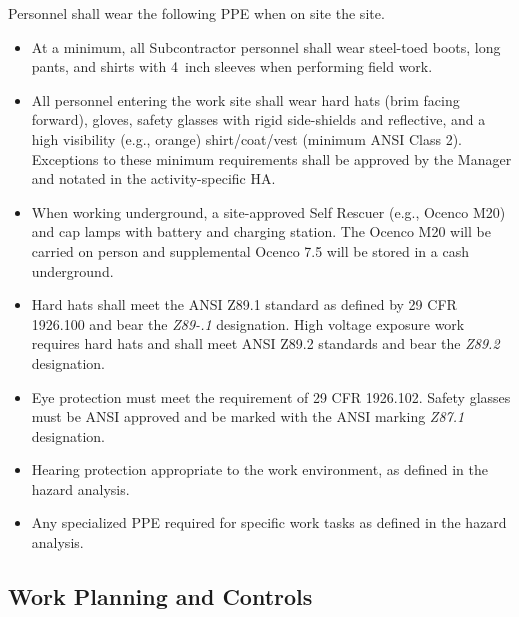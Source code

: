 Personnel shall wear the following PPE when on site the \surf site.
\begin{itemize}
\item At a minimum, all Subcontractor  personnel shall wear
    steel-toed boots, long pants, and shirts with 4~inch sleeves when
    performing field work.
  \item All personnel entering the work site  shall wear hard hats
    (brim facing forward), gloves, safety glasses with rigid
    side-shields and reflective, and a high visibility (e.g., orange)
    shirt/coat/vest (minimum ANSI Class 2).  Exceptions to these
    minimum requirements shall be approved by the   Manager and
    notated in the activity-specific HA.
  \item When working underground, a site-approved Self Rescuer (e.g.,
    Ocenco M20) and cap lamps with battery and charging station. The
    Ocenco M20 will be carried on person and supplemental Ocenco
    7.5 will be stored in a cash underground.
   \item Hard hats shall meet the ANSI Z89.1 standard as defined by 29
     CFR 1926.100 and bear the {\em Z89-.1} designation. High
     voltage exposure work requires hard hats and shall meet ANSI
     Z89.2 standards and bear the {\em Z89.2} designation.
    \item Eye protection must meet the requirement of 29 CFR
      1926.102. Safety glasses must be ANSI approved and be marked
      with the ANSI marking {\em Z87.1} designation.
    \item Hearing protection appropriate to the work environment, as
      defined in the hazard analysis.
    \item Any specialized PPE required for specific work tasks as
      defined in the hazard analysis.
\end{itemize}

\subsection{Work Planning and Controls}

